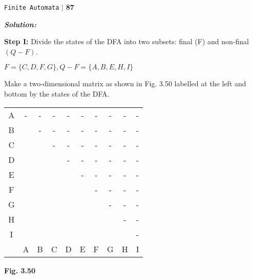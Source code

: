 \documentclass{article}
\begin{document}
\newpage
\begin{flushright}
 \texttt{Finite Automata} \hspace*{0.10cm}\textbf{$|$} \textbf{87}\hspace*{0.5cm}
\end{flushright}

\vspace*{0.5cm}
\emph{
\textbf{Solution:}
}

\small{
\textbf{Step I:} Divide the states of the DFA into two subsets: final (F) and non-final $(Q-F)$.\\

\begin{center}
  $F = \{C, D, F, G\}, Q-F = \{A, B, E, H, I\}$\\
\end{center}

Make a two-dimensional matrix as shown in Fig. 3.50 labelled at the left and bottom by the states of
the DFA.\\

\begin{center}
\begin{tabular}{cccccccccc}
\hline
A& -& -& -& -& -& -& -& -& -\\
B&  & -& -& -& -& -& -& -& -\\
C&  &  & -& -& -& -& -& -& -\\
D&  &  &  & -& -& -& -& -& -\\
E&  &  &  &  & -& -& -& -& -\\
F&  &  &  &  &  & -& -& -& -\\
G&  &  &  &  &  &  & -& -& -\\
H&  &  &  &  &  &  &  & -& -\\
I&  &  &  &  &  &  &  &  & -\\
 &  A& B& C& D& E& F& G& H& I\\
 \hline

 \hline

 \hline

 \hline
\end{tabular}
\end{center}

\begin{center}
  \textbf{Fig. 3.50}\\
\end{center}
}
\end{document}
